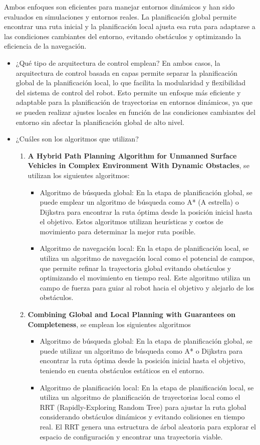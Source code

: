 \documentclass{article}
\begin{document}
Ambos enfoques son eficientes para manejar entornos dinámicos y han sido evaluados en simulaciones y entornos reales. La planificación global permite encontrar una ruta inicial y la planificación local ajusta esa ruta para adaptarse a las condiciones cambiantes del entorno, evitando obstáculos y optimizando la eficiencia de la navegación.

\begin{itemize}
\item ¿Qué tipo de arquitectura de control emplean?
  En ambos casos, la arquitectura de control basada en capas permite separar la planificación global de la planificación local, lo que facilita la modularidad y flexibilidad del sistema de control del robot. Esto permite un enfoque más eficiente y adaptable para la planificación de trayectorias en entornos dinámicos, ya que se pueden realizar ajustes locales en función de las condiciones cambiantes del entorno sin afectar la planificación global de alto nivel.
\item ¿Cuáles son los algoritmos que utilizan?
  \begin{enumerate}
  \item \textbf{A Hybrid Path Planning Algorithm for Unmanned Surface Vehicles in Complex Environment With Dynamic Obstacles}, se utilizan los siguientes algoritmos:
    \begin{itemize}
    \item Algoritmo de búsqueda global: En la etapa de planificación global, se puede emplear un algoritmo de búsqueda como A* (A estrella) o Dijkstra para encontrar la ruta óptima desde la posición inicial hasta el objetivo. Estos algoritmos utilizan heurísticas y costos de movimiento para determinar la mejor ruta posible.
    \item Algoritmo de navegación local: En la etapa de planificación local, se utiliza un algoritmo de navegación local como el potencial de campos, que permite refinar la trayectoria global evitando obstáculos y optimizando el movimiento en tiempo real. Este algoritmo utiliza un campo de fuerza para guiar al robot hacia el objetivo y alejarlo de los obstáculos.
    \end{itemize}
  \item \textbf{Combining Global and Local Planning with Guarantees on Completeness}, se emplean los siguientes algoritmos
    \begin{itemize}
    \item Algoritmo de búsqueda global: En la etapa de planificación global, se puede utilizar un algoritmo de búsqueda como A* o Dijkstra para encontrar la ruta óptima desde la posición inicial hasta el objetivo, teniendo en cuenta obstáculos estáticos en el entorno.
    \item Algoritmo de planificación local: En la etapa de planificación local, se utiliza un algoritmo de planificación de trayectorias local como el RRT (Rapidly-Exploring Random Tree) para ajustar la ruta global considerando obstáculos dinámicos y evitando colisiones en tiempo real. El RRT genera una estructura de árbol aleatoria para explorar el espacio de configuración y encontrar una trayectoria viable.
    \end{itemize}
    

\end{enumerate}
\end{itemize}
\end{document}
